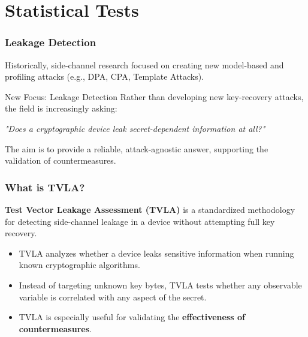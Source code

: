 \section{Statistical Tests}

\begin{frame}
    \frametitle{Leakage Detection}

    Historically, side-channel research focused on creating new model-based and profiling attacks (e.g., DPA, CPA, Template Attacks).

    \vspace{2mm}
    \begin{block}{New Focus: Leakage Detection}
        Rather than developing new key-recovery attacks, the field is increasingly asking:
        \newline
        \begin{center}
            \textit{"Does a cryptographic device leak secret-dependent information at all?"}
        \end{center}
        The aim is to provide a reliable, attack-agnostic answer, supporting the validation of countermeasures.
    \end{block}
\end{frame}

\begin{frame}
    \frametitle{What is TVLA?}

    \textbf{Test Vector Leakage Assessment (TVLA)} is a standardized methodology for detecting side-channel leakage in a device without attempting full key recovery.

    \begin{itemize}
        \item TVLA analyzes whether a device leaks sensitive information when running known cryptographic algorithms.
        \item Instead of targeting unknown key bytes, TVLA tests whether any observable variable is correlated with any aspect of the secret.
        \item TVLA is especially useful for validating the \textbf{effectiveness of countermeasures}.
    \end{itemize}
\end{frame}

